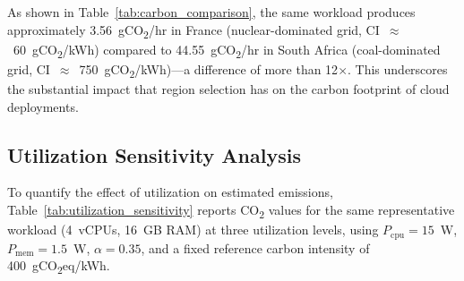 \documentclass[12pt]{article}
\begin{document}
\begin{table}[htbp]
\centering
\caption{CO\textsubscript{2} emissions (g/hr) for 4 vCPU, 16 GB RAM at 50\% utilization across selected regions.}
\label{tab:carbon_comparison}
\small
{}
\end{table}

As shown in Table~\ref{tab:carbon_comparison}, the same workload produces approximately 3.56~gCO\textsubscript{2}/hr in France (nuclear-dominated grid, CI~$\approx$~60~gCO\textsubscript{2}/kWh) compared to 44.55~gCO\textsubscript{2}/hr in South Africa (coal-dominated grid, CI~$\approx$~750~gCO\textsubscript{2}/kWh)---a difference of more than 12$\times$. This underscores the substantial impact that region selection has on the carbon footprint of cloud deployments.

\subsection{Utilization Sensitivity Analysis}

To quantify the effect of utilization on estimated emissions, Table~\ref{tab:utilization_sensitivity} reports CO\textsubscript{2} values for the same representative workload (4~vCPUs, 16~GB RAM) at three utilization levels, using $P_{\text{cpu}}=15$~W, $P_{\text{mem}}=1.5$~W, $\alpha=0.35$, and a fixed reference carbon intensity of 400~gCO\textsubscript{2}eq/kWh.
\end{document}
